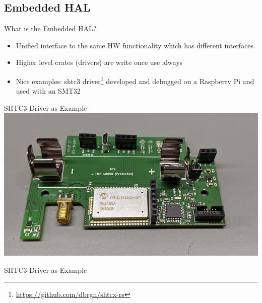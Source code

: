 \documentclass[aspectratio=1610,14pt,t]{beamer}
\begin{document}
\subsection{Embedded HAL}

\begin{frame}[c]{What is the Embedded HAL?}
  \begin{itemize}
  \item Unified interface to the same HW functionality which has different
    interfaces
  \item Higher level crates (drivers) are write once use always
  \item Nice examples: shtc3
    driver\footnote{\url{https://github.com/dbrgn/shtcx-rs}} developed and
    debugged on a  Raspberry Pi and used with an SMT32
  \end{itemize}
\end{frame}

\begin{frame}[c]{SHTC3 Driver as Example}
  \includegraphics[height=0.8\textheight]{./img/gfroerli.jpg}
\end{frame}

\begin{frame}[c]{SHTC3 Driver as Example}
\end{frame}
\end{document}
